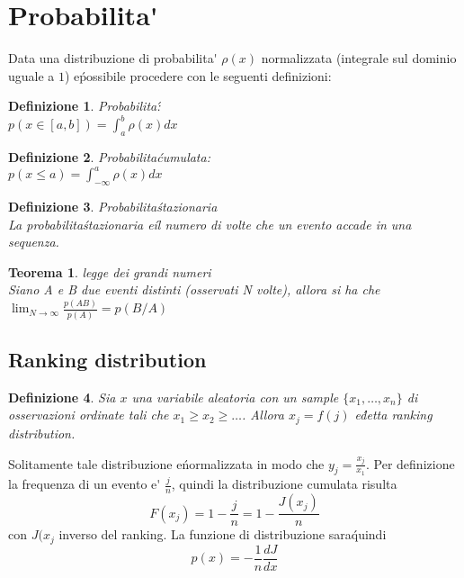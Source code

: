 \documentclass[12pt, a4paper]{book}
\theoremstyle{theorem}
\newtheorem{definition}{Definizione}[section]
\newtheorem{theorem}{Teorema}[section]
\begin{document}
		\section{Probabilita\'}
			Data una distribuzione di probabilita\' $\rho(x)$ normalizzata (integrale sul dominio uguale a $1$) e\' possibile procedere con le seguenti definizioni:
			\begin{definition} Probabilita\':\\
				$p(x\in[a,b])=\int_{a}^{b}\rho(x)dx$
			\end{definition}
			\begin{definition} Probabilita\' cumulata:\\
				$p(x\leq a)=\int_{-\infty}^{a}\rho(x)dx$
			\end{definition}
			\begin{definition}
				Probabilita\' stazionaria\\
				La probabilita\' stazionaria e\' il numero di volte che un evento accade in una sequenza.
			\end{definition}
			\begin{theorem}
				legge dei grandi numeri\\
				Siano A e B due eventi distinti (osservati N volte), allora si ha che\\
				$\lim_{N\to\infty}\frac{p(AB)}{p(A)}=p(B/A)$
			\end{theorem}
			\subsection{Ranking distribution}
				\begin{definition}
					Sia $x$ una variabile aleatoria con un sample $\{x_{1},\ldots,x_{n}\}$ di osservazioni ordinate tali che $x_{1}\geq x_{2}\geq\ldots$.
					Allora $x_{j}=f(j)$ e\' detta ranking distribution.
				\end{definition}
				Solitamente tale distribuzione e\' normalizzata in modo che $y_{j}=\frac{x_{j}}{x_{1}}$.
				Per definizione la frequenza di un evento e\' $\frac{j}{n}$, quindi la distribuzione cumulata risulta
				\begin{equation}
					F(x_{j})=1-\frac{j}{n}=1-\frac{J(x_{j})}{n}
				\end{equation}
				con $J(x_{j}$ inverso del ranking.
				La funzione di distribuzione sara\' quindi
				\begin{equation}
					p(x)=-\frac{1}{n}\frac{dJ}{dx}
				\end{equation}
		
\end{document}
